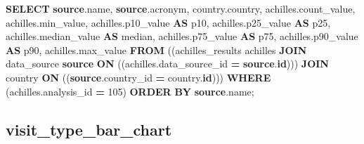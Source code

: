 \documentclass[
]{book}
\newenvironment{Shaded}{\begin{snugshade}}{\end{snugshade}}
\newcommand{\DecValTok}[1]{\textcolor[rgb]{0.00,0.00,0.81}{#1}}
\newcommand{\FunctionTok}[1]{\textcolor[rgb]{0.00,0.00,0.00}{#1}}
\newcommand{\KeywordTok}[1]{\textcolor[rgb]{0.13,0.29,0.53}{\textbf{#1}}}
\newcommand{\NormalTok}[1]{#1}
\newcommand{\OperatorTok}[1]{\textcolor[rgb]{0.81,0.36,0.00}{\textbf{#1}}}
\begin{document}
\begin{Shaded}
\begin{Highlighting}[]
\KeywordTok{SELECT} \KeywordTok{source}\NormalTok{.name,}
   \KeywordTok{source}\NormalTok{.acronym,}
\NormalTok{   country.country,}
\NormalTok{   achilles.count\_value,}
\NormalTok{   achilles.min\_value,}
\NormalTok{   achilles.p10\_value }\KeywordTok{AS}\NormalTok{ p10,}
\NormalTok{   achilles.p25\_value }\KeywordTok{AS}\NormalTok{ p25,}
\NormalTok{   achilles.median\_value }\KeywordTok{AS} \FunctionTok{median}\NormalTok{,}
\NormalTok{   achilles.p75\_value }\KeywordTok{AS}\NormalTok{ p75,}
\NormalTok{   achilles.p90\_value }\KeywordTok{AS}\NormalTok{ p90,}
\NormalTok{   achilles.max\_value}
  \KeywordTok{FROM}\NormalTok{ ((achilles\_results achilles}
    \KeywordTok{JOIN}\NormalTok{ data\_source }\KeywordTok{source} \KeywordTok{ON}\NormalTok{ ((achilles.data\_source\_id }\OperatorTok{=} \KeywordTok{source}\NormalTok{.}\KeywordTok{id}\NormalTok{)))}
    \KeywordTok{JOIN}\NormalTok{ country }\KeywordTok{ON}\NormalTok{ ((}\KeywordTok{source}\NormalTok{.country\_id }\OperatorTok{=}\NormalTok{ country.}\KeywordTok{id}\NormalTok{)))}
 \KeywordTok{WHERE}\NormalTok{ (achilles.analysis\_id }\OperatorTok{=} \DecValTok{105}\NormalTok{)}
 \KeywordTok{ORDER} \KeywordTok{BY} \KeywordTok{source}\NormalTok{.name;}
\end{Highlighting}
\end{Shaded}

\hypertarget{visit_type_bar_chart}{%
\subsection*{visit\_type\_bar\_chart}\label{visit_type_bar_chart}}
\end{document}
